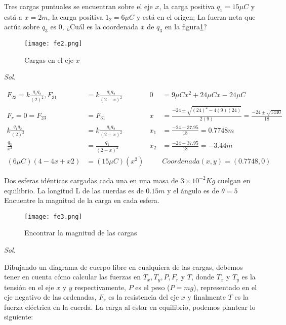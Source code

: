 \begin{example}
	Tres cargas puntuales se encuentran sobre el eje $x$, la carga positiva $q_{1}=15\mu C$ y está a
	$x=2m$, la carga positiva $1_{2}=6\mu C$ y está en el origen; La fuerza neta que actúa sobre $q_{3}$
	es $0$, ¿Cuál es la coordenada $x$ de $q_{3}$ en la figura\ref{fe2}?
	\begin{figure}[h!]
		\centerline{\texttt{[image: fe2.png]}}
		\caption{Cargas en el eje $x$}
		\label{fe2}
	\end{figure}
\end{example}

\textit{ Sol. }

\begin{align*}
	F_{23}= k \frac{q_{1}q_{2}}{(2)^2 },  F_{31} & = k \frac{q_{1}q_{2}}{(2-x)^2 } & 0     & = 9\mu C x^2  + 24\mu C x -24\mu C                                            \\
	F_{r}=0=F_{23}                               & =F_{31}                         & x     & = \frac{-24\pm \sqrt{(24)^2 -4(9)(24)} }{2(9)}= \frac{-24\pm \sqrt{1440}}{18} \\
	k \frac{q_{1}q_{2}}{(2)^2 }                  & =k \frac{q_{1}q_{2}}{(2-x)^2 }  & x_1& = \frac{-24+37{.}95}{18}=0{.}7748m                                            \\
	\frac{q_{2}}{x^2 }                           & =\frac{q_{1}}{(2-x)^2}          & x_{2} & = \frac{-24-37{.}95}{18}=-3{.}44m                                             \\
	(6 \mu C)(4-4x+x{2})                         & =(15\mu C)(x^2 )                &       & Coordenada (x,y)= (0{.}7748 , 0)
\end{align*}

\begin{example}
	Dos esferas idénticas cargadas cada una en una masa de $3 \times 10^{-2}Kg$
	cuelgan en equilibrio. La longitud L de las cuerdas es de $0.15m$
	y el ángulo es de $\theta =5$ Encuentre la magnitud de la carga en cada esfera.
	\begin{figure}[h!]
		\centerline{\texttt{[image: fe3.png]}}
		\caption{Encontrar la magnitud de las cargas}
		\label{fe3}
	\end{figure}
\end{example}

\textit{ Sol. }

Dibujando un diagrama de cuerpo libre en cualquiera de las cargas, debemos tener en cuenta cómo calcular las fuerzas en $T_{x}, T_{y}, P, F_{r}$ y $T$,
donde $T_{x}$ y $T_{y}$ es la tensión en el eje $x$ y $y$ respectivamente, $P$ es el peso ($P=mg$), representado en el eje negativo de las ordenadas, $F_{r}$ es la resistencia del eje $x$
y finalmente $T$ es la fuerza eléctrica en la cuerda. La carga al estar en equilibrio, podemos plantear lo siguiente:

